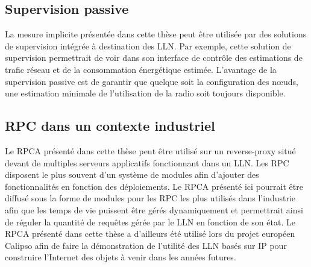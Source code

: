 \subsection{Supervision passive}

La mesure implicite présentée dans cette thèse peut être utilisée par des solutions de supervision intégrée à destination des \ac{LLN}.
Par exemple, cette solution de supervision permettrait de voir dans son interface de contrôle des estimations de trafic réseau et de la consommation énergétique estimée.
L'avantage de la supervision passive est de garantir que quelque soit la configuration des nœuds, une estimation minimale de l'utilisation de la radio soit toujours disponible.

\subsection{\ac{RPC} dans un contexte industriel}

Le \ac{RPCA} présenté dans cette thèse peut être utilisé sur un reverse-proxy situé devant de multiples serveurs applicatifs fonctionnant dans un \ac{LLN}.
Les \ac{RPC} disposent le plus souvent d'un système de modules afin d'ajouter des fonctionnalités en fonction des déploiements.
Le \ac{RPCA} présenté ici pourrait être diffusé sous la forme de modules pour les \ac{RPC} les plus utilisés dans l'industrie afin que les temps de vie puissent être gérés dynamiquement et permettrait ainsi de réguler la quantité de requêtes gérée par le \ac{LLN} en fonction de son état.
Le \ac{RPCA} présenté dans cette thèse a d'ailleurs été utilisé lors du projet européen Calipso afin de faire la démonstration de l'utilité des \ac{LLN} basés sur IP pour construire l'Internet des objets à venir dans les années futures.

